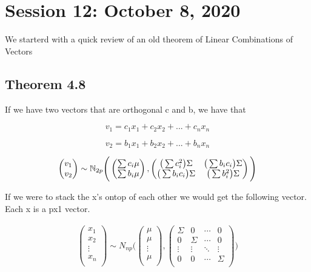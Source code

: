 \chapter{Session 12: October 8, 2020}
We starterd with a quick review of an old theorem of Linear Combinations of Vectors
\section{Theorem 4.8}
If we have two vectors that are orthogonal c and b, we have that

\[v_1 = c_1x_1 + c_2x_2 + ...+ c_n x_n \]

\[v_2 = b_1x_1 + b_2x_2 + ...+ b_n x_n \]

\[\begin{pmatrix}
v_1 \\ v_2
\end{pmatrix} \sim
\mathbb{N}_{2p}\Bigg(\begin{pmatrix}
\sum c_i \mu \\ \sum b_i \mu
\end{pmatrix},
\begin{pmatrix}
\big(\sum c_i^2\big)\Sigma & \big(\sum b_ic_i\big) \Sigma \\
\big(\sum b_ic_i\big) \Sigma  &
\big(\sum b_i^2\big)\Sigma
\end{pmatrix}
\Bigg)
\]

If we were to stack the x's ontop of each other we would get the following vector. Each x is a px1 vector.

\begin{gather*}
    \begin{pmatrix}
    x_1\\
    x_2\\
    \vdots\\
    x_n\\
    \end{pmatrix} \sim
    N_{np} \Bigg(
    \begin{pmatrix}
    \mu \\ \mu \\ \vdots \\ \mu \\
    \end{pmatrix},
    \begin{pmatrix}
    \Sigma & 0 & \cdots & 0 \\
    0 & \Sigma & \cdots & 0 \\
    \vdots & \vdots & \ddots & \vdots \\
    0 & 0 & \cdots & \Sigma \\
    \end{pmatrix}
    \Bigg)
\end{gather*}

